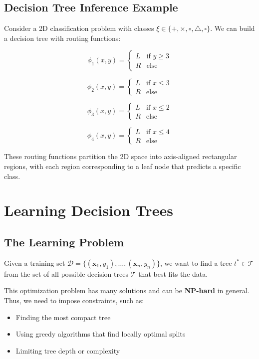 \documentclass[11pt,a4paper]{article}
\theoremstyle{definition}
\theoremstyle{plain}
\theoremstyle{remark}
\begin{document}
\subsection{Decision Tree Inference Example}

Consider a 2D classification problem with classes \(\xi \in \{+, \times, \circ, \triangle, \square\}\). We can build a decision tree with routing functions:

\[
\phi_1(x, y) = \begin{cases}
L & \text{if } y \geq 3 \\
R & \text{else}
\end{cases}
\]

\[
\phi_2(x, y) = \begin{cases}
L & \text{if } x \leq 3 \\
R & \text{else}
\end{cases}
\]

\[
\phi_3(x, y) = \begin{cases}
L & \text{if } x \leq 2 \\
R & \text{else}
\end{cases}
\]

\[
\phi_4(x, y) = \begin{cases}
L & \text{if } x \leq 4 \\
R & \text{else}
\end{cases}
\]

These routing functions partition the 2D space into axis-aligned rectangular regions, with each region corresponding to a leaf node that predicts a specific class.

\section{Learning Decision Trees}

\subsection{The Learning Problem}

Given a training set \(\mathcal{D} = \{(\mathbf{x}_1, y_1), \ldots, (\mathbf{x}_n, y_n)\}\), we want to find a tree \(t^* \in \mathcal{T}\) from the set of all possible decision trees \(\mathcal{T}\) that best fits the data.

\begin{tcolorbox}[colback=orange!5!white,colframe=orange!75!black,title=\textbf{The Challenge}]
This optimization problem has many solutions and can be \textbf{NP-hard} in general. Thus, we need to impose constraints, such as:
\begin{itemize}
    \item Finding the most compact tree
    \item Using greedy algorithms that find locally optimal splits
    \item Limiting tree depth or complexity
\end{itemize}
\end{tcolorbox}
\end{document}
